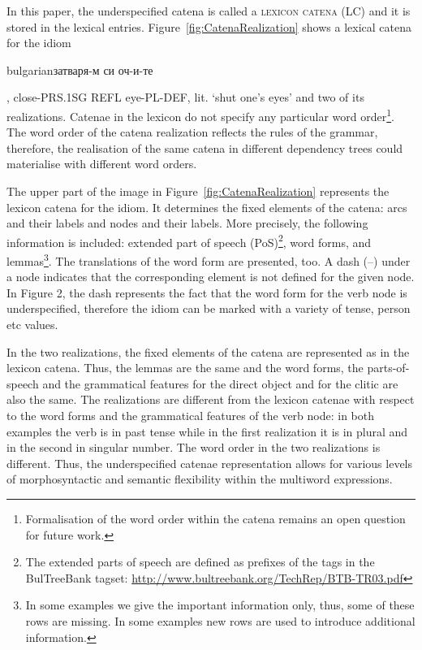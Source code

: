 \documentclass[output=paper]{langsci/langscibook}
\begin{document}
In this paper, the underspecified catena is called a \textsc{ lexicon catena (LC)}
 and it is stored in the lexical entries.
Figure~\ref{fig:CatenaRealization} shows a lexical catena for the idiom 
\begin{otherlanguage*}{bulgarian}затваря-м си
оч-и-те\end{otherlanguage*}, close-\textsc{PRS.1SG} \textsc{REFL} eye-\textsc{PL-DEF}, lit.
`shut one's eyes' and two of its realizations. Catenae in the lexicon do not
specify any particular word order\footnote{Formalisation of the word order
within the catena remains an open question for future work.}. The word order
of the catena realization reflects the rules of the grammar, therefore, the
realisation of the same catena in different dependency trees could
materialise with different word orders.

The upper part of the image in Figure~\ref{fig:CatenaRealization} represents
the lexicon catena for the idiom. It determines the fixed elements of the
catena: arcs and their labels and nodes and their labels. More precisely, the
following information is included: extended part of speech (PoS)\footnote{The
extended parts of speech are defined as prefixes of the tags in the
BulTreeBank tagset: \url{http://www.bultreebank.org/TechRep/BTB-TR03.pdf}}, word
forms, and lemmas\footnote{In some examples we give the important
information only, thus, some of these rows are missing. In some examples new
rows are used to introduce additional information.}. The translations of the
word form are presented, too. A dash (--) under a node indicates that the
corresponding element is not defined for the given node. In Figure 2, the dash
represents the fact that the word form for the verb node is
underspecified, therefore the idiom can be marked with a variety of tense,
person etc values.

In the two realizations, the fixed elements of the catena are represented as
in the lexicon catena. Thus, the lemmas are the same and the word forms, the
parts-of-speech and the grammatical features for the direct object and for
the clitic are also the same. The realizations are different from the lexicon
catenae with respect to the word forms and the grammatical features of the
verb node: in both examples the verb is in past tense while in the first
realization it is in plural and in the second in singular number. The word
order in the two realizations is different. Thus, the underspecified catenae
representation allows for various levels of morphosyntactic and semantic
flexibility within the multiword expressions.
\end{document}
